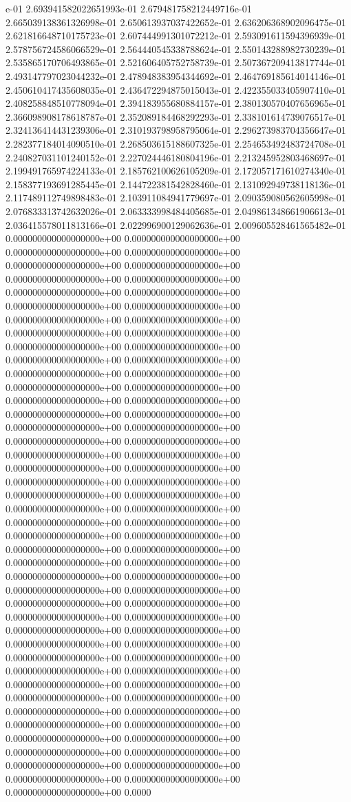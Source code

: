 e-01	2.693941582022651993e-01	2.679481758212449716e-01	2.665039138361326998e-01	2.650613937037422652e-01	2.636206368902096475e-01	2.621816648710175723e-01	2.607444991301072212e-01	2.593091611594396939e-01	2.578756724586066529e-01	2.564440545338788624e-01	2.550143288982730239e-01	2.535865170706493865e-01	2.521606405752758739e-01	2.507367209413817744e-01	2.493147797023044232e-01	2.478948383954344692e-01	2.464769185614014146e-01	2.450610417435608035e-01	2.436472294875015043e-01	2.422355033405907410e-01	2.408258848510778094e-01	2.394183955680884157e-01	2.380130570407656965e-01	2.366098908178618787e-01	2.352089184468292293e-01	2.338101614739076517e-01	2.324136414431239306e-01	2.310193798958795064e-01	2.296273983704356647e-01	2.282377184014090510e-01	2.268503615188607325e-01	2.254653492483724708e-01	2.240827031101240152e-01	2.227024446180804196e-01	2.213245952803468697e-01	2.199491765974224133e-01	2.185762100626105209e-01	2.172057171610274340e-01	2.158377193691285445e-01	2.144722381542828460e-01	2.131092949738118136e-01	2.117489112749898483e-01	2.103911084941779697e-01	2.090359080562605998e-01	2.076833313742632026e-01	2.063333998484405685e-01	2.049861348661906613e-01	2.036415578011813166e-01	2.022996900129062636e-01	2.009605528461565482e-01	0.000000000000000000e+00	0.000000000000000000e+00	0.000000000000000000e+00	0.000000000000000000e+00	0.000000000000000000e+00	0.000000000000000000e+00	0.000000000000000000e+00	0.000000000000000000e+00	0.000000000000000000e+00	0.000000000000000000e+00	0.000000000000000000e+00	0.000000000000000000e+00	0.000000000000000000e+00	0.000000000000000000e+00	0.000000000000000000e+00	0.000000000000000000e+00	0.000000000000000000e+00	0.000000000000000000e+00	0.000000000000000000e+00	0.000000000000000000e+00	0.000000000000000000e+00	0.000000000000000000e+00	0.000000000000000000e+00	0.000000000000000000e+00	0.000000000000000000e+00	0.000000000000000000e+00	0.000000000000000000e+00	0.000000000000000000e+00	0.000000000000000000e+00	0.000000000000000000e+00	0.000000000000000000e+00	0.000000000000000000e+00	0.000000000000000000e+00	0.000000000000000000e+00	0.000000000000000000e+00	0.000000000000000000e+00	0.000000000000000000e+00	0.000000000000000000e+00	0.000000000000000000e+00	0.000000000000000000e+00	0.000000000000000000e+00	0.000000000000000000e+00	0.000000000000000000e+00	0.000000000000000000e+00	0.000000000000000000e+00	0.000000000000000000e+00	0.000000000000000000e+00	0.000000000000000000e+00	0.000000000000000000e+00	0.000000000000000000e+00	0.000000000000000000e+00	0.000000000000000000e+00	0.000000000000000000e+00	0.000000000000000000e+00	0.000000000000000000e+00	0.000000000000000000e+00	0.000000000000000000e+00	0.000000000000000000e+00	0.000000000000000000e+00	0.000000000000000000e+00	0.000000000000000000e+00	0.000000000000000000e+00	0.000000000000000000e+00	0.000000000000000000e+00	0.000000000000000000e+00	0.000000000000000000e+00	0.000000000000000000e+00	0.000000000000000000e+00	0.000000000000000000e+00	0.000000000000000000e+00	0.000000000000000000e+00	0.000000000000000000e+00	0.000000000000000000e+00	0.000000000000000000e+00	0.000000000000000000e+00	0.000000000000000000e+00	0.000000000000000000e+00	0.000000000000000000e+00	0.000000000000000000e+00	0.000000000000000000e+00	0.000000000000000000e+00	0.000000000000000000e+00	0.000000000000000000e+00	0.0000